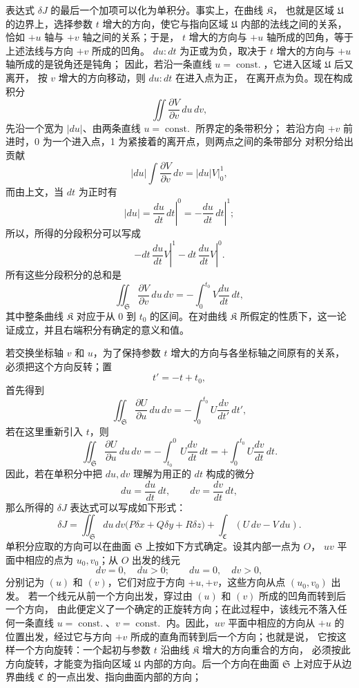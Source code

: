 \documentclass[11pt,a4paper,leqno]{article}
\begin{document}
表达式 $\delta J$ 的最后一个加项可以化为单积分。事实上，在曲线 $\mathfrak{K}$，
也就是区域 $\mathfrak{U}$ 的边界上，选择参数 $t$ 增大的方向，使它与指向区域
$\mathfrak{U}$ 内部的法线之间的关系，恰如 $+u$ 轴与 $+v$ 轴之间的关系；于是，
$t$ 增大的方向与 $+u$ 轴所成的凹角，等于上述法线与方向 $+v$ 所成的凹角。
$du:dt$ 为正或为负，取决于 $t$ 增大的方向与 $+u$ 轴所成的是锐角还是钝角；
因此，若沿一条直线 $u=\operatorname{const.}$，它进入区域 $\mathfrak{U}$ 后又离开，
按 $v$ 增大的方向移动，则 $du:dt$ 在进入点为正，
在离开点为负。现在构成积分
\[
\iint\frac{\partial V}{\partial v}\,du\,dv,
\]
先沿一个宽为 $|du|$、由两条直线 $u=\operatorname{const.}$ 所界定的条带积分；
若沿方向 $+v$ 前进时，0 为一个进入点，1 为紧接着的离开点，则两点之间的条带部分
对积分给出贡献
\[
|du|\int\frac{\partial V}{\partial v}\,dv
=|du|\left.V\right|_0^1,
\]
而由上文，当 $dt$ 为正时有
\[
|du|=\left.\frac{du}{dt}\,dt\right|^0
=-\left.\frac{du}{dt}\,dt\right|^1;
\]
所以，所得的分段积分可以写成
\[
-\left.dt\,\frac{du}{dt}V\right|^1
-\left.dt\,\frac{du}{dt}V\right|^0.
\]
所有这些分段积分的总和是
\[
\iint_{\mathfrak{S}}\frac{\partial V}{\partial v}\,du\,dv
=-\int_0^{t_0}V\frac{du}{dt}\,dt,
\]
其中整条曲线 $\mathfrak{K}$ 对应于从 0 到 $t_0$ 的区间。在对曲线 $\mathfrak{K}$
所假定的性质下，这一论证成立，并且右端积分有确定的意义和值。

若交换坐标轴 $v$ 和 $u$，为了保持参数 $t$ 增大的方向与各坐标轴之间原有的关系，
必须把这个方向反转；置
\[
t'=-t+t_0,
\]
首先得到
\[
\iint_{\mathfrak{S}}\frac{\partial U}{\partial u}\,du\,dv
=-\int_0^{t_0}U\frac{dv}{dt'}\,dt',
\]
若在这里重新引入 $t$，则
\[
\iint_{\mathfrak{S}}\frac{\partial U}{\partial u}\,du\,dv
=-\int_{t_0}^{0}U\frac{dv}{dt}\,dt
=+\int_0^{t_0}U\frac{dv}{dt}\,dt.
\]
因此，若在单积分中把 $du,dv$ 理解为用正的 $dt$ 构成的微分
\[
du=\frac{du}{dt}\,dt,\qquad
dv=\frac{dv}{dt}\,dt,
\]
那么所得的 $\delta J$ 表达式可以写成如下形式：
\[
\delta J=\iint_{\mathfrak{S}}du\,dv
\bigl(P\delta x+Q\delta y+R\delta z\bigr)
+\int_{\mathfrak{C}}(U\,dv-V\,du).
\]
单积分应取的方向可以在曲面 $\mathfrak{S}$ 上按如下方式确定。设其内部一点为 $O$，
$uv$ 平面中相应的点为 $u_0,v_0$；从 $O$ 出发的线元
\[
dv=0,\quad du>0;\qquad du=0,\quad dv>0,
\]
分别记为 $(u)$ 和 $(v)$，它们对应于方向 $+u,+v$，这些方向从点 $(u_0,v_0)$ 出发。
若一个线元从前一个方向出发，穿过由 $(u)$ 和 $(v)$ 所成的凹角而转到后一个方向，
由此便定义了一个确定的正旋转方向；在此过程中，该线元不落入任何一条直线
$u=\operatorname{const.}$、$v=\operatorname{const.}$ 内。因此，$uv$ 平面中相应的方向从
$+u$ 的位置出发，经过它与方向 $+v$ 所成的直角而转到后一个方向；也就是说，
它按这样一个方向旋转：一个起初与参数 $t$ 沿曲线 $\mathfrak{K}$ 增大的方向重合的方向，
必须按此方向旋转，才能变为指向区域 $\mathfrak{U}$ 内部的方向。后一个方向在曲面
$\mathfrak{S}$ 上对应于从边界曲线 $\mathfrak{C}$ 的一点出发、指向曲面内部的方向；
\end{document}
